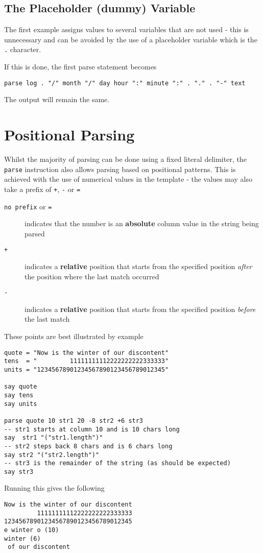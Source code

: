 \subsection{The Placeholder (dummy) Variable}
The first example assigns values to several variables that are not used - this is unnecessary and can be avoided by the use of a placeholder variable which is the \texttt{.} character.

If this is done, the first parse statement becomes
\begin{verbatim}
parse log . "/" month "/" day hour ":" minute ":" . "." . "-" text
\end{verbatim}
The output will remain the same.

\section{Positional Parsing}

Whilst the majority of parsing can be done using a fixed literal delimiter, the \texttt{parse} instruction also allows parsing based on positional patterns. This is achieved with the use of numerical values in the template - the values may also take a prefix of \texttt{+}, \texttt{-} or \texttt{=}

\begin{description}
\item[\texttt{no prefix} or \texttt{=}] indicates that the number is an \textbf{absolute} column value in the string being parsed
\item[\texttt{+}] indicates a \textbf{relative} position that starts from the specified position \textit{after} the position where the last match occurred
\item[\texttt{-}] indicates a \textbf{relative} position that starts from the specified position \textit{before} the last match
\end{description}

These points are best illustrated by example
\begin{lstlisting}[label=positionalParsing, caption=Positional Parsing]
quote = "Now is the winter of our discontent"
tens  = "         11111111112222222222333333"
units = "12345678901234567890123456789012345"

say quote
say tens
say units

parse quote 10 str1 20 -8 str2 +6 str3
-- str1 starts at column 10 and is 10 chars long
say  str1 "("str1.length")"
-- str2 steps back 8 chars and is 6 chars long
say str2 "("str2.length")"
-- str3 is the remainder of the string (as should be expected)
say str3
\end{lstlisting}
Running this gives the following
\begin{verbatim}
Now is the winter of our discontent 
         11111111112222222222333333 
12345678901234567890123456789012345 
e winter o (10) 
winter (6) 
 of our discontent 
\end{verbatim}

